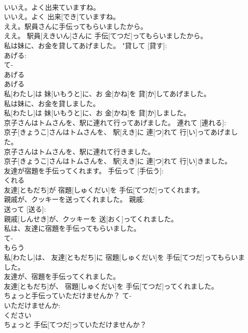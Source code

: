 \documentclass[8pt]{extreport}
\begin{document}
\begin{CJK}{UTF8}{min}
\\	いいえ。よく出来ていますね。	
\\	いいえ。よく 出来[でき]ていますね。	
\\	ええ。駅員さんに手伝ってもらいましたから。	
\\	ええ。 駅員[えきいん]さんに 手伝[てつだ]ってもらいましたから。	
\\	私は妹に、お金を貸してあげました。	"貸して [貸す]: 
\\	あげる: 
\\	て-
\\	あげる 
\\	あげる 
\\	私[わたし]は 妹[いもうと]に、お 金[かね]を 貸[か]してあげました。	
\\	私は妹に、お金を貸しました。	
\\	私[わたし]は 妹[いもうと]に、お 金[かね]を 貸[か]しました。	
\\	京子さんはトムさんを、駅に連れて行ってあげました。	連れて [連れる]: 
\\	京子[きょうこ]さんはトムさんを、 駅[えき]に 連[つ]れて 行[い]ってあげました。	
\\	京子さんはトムさんを、駅に連れて行きました。	
\\	京子[きょうこ]さんはトムさんを、 駅[えき]に 連[つ]れて 行[い]きました。	
\\	友達が宿題を手伝ってくれます。	手伝って [手伝う]: 
\\	くれる 
\\	友達[ともだち]が 宿題[しゅくだい]を 手伝[てつだ]ってくれます。	
\\	親戚が、クッキーを送ってくれました。	親戚: 
\\	送って [送る]: 
\\	親戚[しんせき]が、クッキーを 送[おく]ってくれました。	
\\	私は、友達に宿題を手伝ってもらいました。	
\\	て-
\\	もらう 
\\	私[わたし]は、 友達[ともだち]に 宿題[しゅくだい]を 手伝[てつだ]ってもらいました。	
\\	友達が、宿題を手伝ってくれました。	
\\	友達[ともだち]が、 宿題[しゅくだい]を 手伝[てつだ]ってくれました。	
\\	ちょっと手伝っていただけませんか？	て-
\\	いただけませんか: 
\\	ください 
\\	ちょっと 手伝[てつだ]っていただけませんか？	

\end{CJK}
\end{document}
